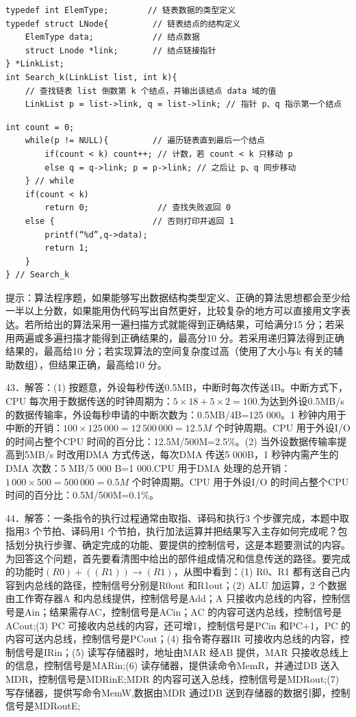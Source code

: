 \documentclass[UTF8,11pt]{ctexart}
\begin{document}
\begin{Verbatim}[breaklines,breakanywhere,fontsize=\small]
typedef int ElemType;        // 链表数据的类型定义
typedef struct LNode{         // 链表结点的结构定义
    ElemType data;            // 结点数据
    struct Lnode *link;       // 结点链接指针
} *LinkList;
int Search_k(LinkList list, int k){
    // 查找链表 list 倒数第 k 个结点，并输出该结点 data 域的值
    LinkList p = list->link, q = list->link; // 指针 p、q 指示第一个结点
\end{Verbatim}

\begin{Verbatim}[breaklines,breakanywhere,fontsize=\small]
    int count = 0;
    while(p != NULL){         // 遍历链表直到最后一个结点
        if(count < k) count++; // 计数，若 count < k 只移动 p
        else q = q->link; p = p->link; // 之后让 p、q 同步移动
    } // while
    if(count < k)
        return 0;              // 查找失败返回 0
    else {                    // 否则打印并返回 1
        printf(“%d”,q->data);
        return 1;
    }
} // Search_k
\end{Verbatim}

提示：算法程序题，如果能够写出数据结构类型定义、正确的算法思想都会至少给一半以上分数，如果能用伪代码写出自然更好，比较复杂的地方可以直接用文字表达。若所给出的算法采用一遍扫描方式就能得到正确结果，可给满分15 分；若采用两遍或多遍扫描才能得到正确结果的，最高分10 分。若采用递归算法得到正确结果的，最高给10 分；若实现算法的空间复杂度过高（使用了大小与k 有关的辅助数组），但结果正确，最高给10 分。


43．解答：(1) 按题意，外设每秒传送0.5MB，中断时每次传送4B。中断方式下，CPU 每次用于数据传送的时钟周期为：\(\displaystyle 5\times18+5\times2=100\).为达到外设0.5MB/s 的数据传输率，外设每秒申请的中断次数为：0.5MB/4B=125 000。1 秒钟内用于中断的开销：\(\displaystyle 100\times125\,000=12\,500\,000=12.5M\) 个时钟周期。CPU 用于外设I/O 的时间占整个CPU 时间的百分比：12.5M/500M=2.5\%。(2) 当外设数据传输率提高到5MB/s 时改用DMA 方式传送，每次DMA 传送5 000B，1 秒钟内需产生的DMA 次数：5 MB/5 000 B=1 000.CPU 用于DMA 处理的总开销：\(\displaystyle 1\,000\times500=500\,000=0.5M\) 个时钟周期。CPU 用于外设I/O 的时间占整个CPU 时间的百分比：0.5M/500M=0.1\%。


44．解答：一条指令的执行过程通常由取指、译码和执行3 个步骤完成，本题中取指用3 个节拍、译码用1 个节拍，执行加法运算并把结果写入主存如何完成呢？包括划分执行步骤、确定完成的功能、要提供的控制信号，这是本题要测试的内容。为回答这个问题，首先要看清图中给出的部件组成情况和信息传送的路径。要完成的功能时\(\displaystyle (R0)+((R1))\to(R1)\)，从图中看到：(1) R0、R1 都有送自己内容到内总线的路径，控制信号分别是R0out 和R1out；(2) ALU 加运算，2 个数据由工作寄存器A 和内总线提供，控制信号是Add；A 只接收内总线的内容，控制信号是Ain；结果需存AC，控制信号是ACin；AC 的内容可送内总线，控制信号是ACout;(3) PC 可接收内总线的内容，还可增1，控制信号是PCin 和PC+1，PC 的内容可送内总线，控制信号是PCout；(4) 指令寄存器IR 可接收内总线的内容，控制信号是IRin；(5) 读写存储器时，地址由MAR 经AB 提供，MAR 只接收总线上的信息，控制信号是MARin;(6) 读存储器，提供读命令MemR，并通过DB 送入MDR，控制信号是MDRinE;MDR 的内容可送入总线，控制信号是MDRout;(7) 写存储器，提供写命令MemW,数据由MDR 通过DB 送到存储器的数据引脚，控制信号是MDRoutE;
\end{document}

